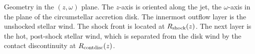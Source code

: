 \label{fig:sketch}
Geometry in the $(z, \omega)$ plane. The $z$-axis is oriented along the jet, the $\omega$-axis in the plane of the circumstellar accretion disk. The innermost outflow layer is the unshocked stellar wind. The shock front is located at $R_{\rm{shock}}(z)$. The next layer is the hot, post-shock stellar wind, which is separated from the disk wind by the contact discontinuity at $R_{\rm{contdisc}}(z)$.